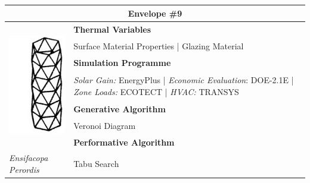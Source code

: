 \begin{table}
	\begin{tabular}{ | m{6cm} | m{14cm} |}
	\toprule
	\multicolumn{2}{c}{Envelope \#{}9} \\[1cm] \hline
	\multirow{7}{*}{\includegraphics[height=5.5cm]{./Images/18-Envelope9}} & \textbf{Thermal Variables} \\[1cm]
	& Surface Material Properties | Glazing Material \vspace{0.5cm}\\ \cline{2-2}
		 & \textbf{Simulation Programme} \\[1cm]
		 & \emph{Solar Gain:} EnergyPlus | \emph{Economic Evaluation}: DOE-2.1E | \emph{Zone Loads:} ECOTECT | \emph{HVAC:} TRANSYS \vspace{0.5cm}\\ \cline{2-2}
		 & \textbf{Generative Algorithm} \\[1cm]
		 & Veronoi Diagram\vspace{0.5cm}\\ \cline{2-2}
		 & \textbf{Performative Algorithm} \\[1cm]
		 \emph{Ensifacopa Perordis} &  Tabu Search\vspace{0.5cm}\\
	\bottomrule
	\end{tabular}
\end{table}

\clearpage


